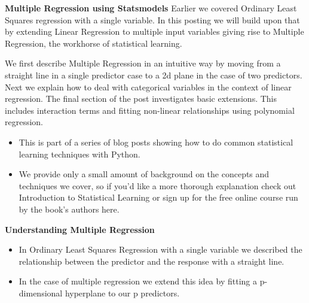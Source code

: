 \begin{frame}[fragile]
	\Large
	\textbf{Multiple Regression using Statsmodels}
Earlier we covered Ordinary Least Squares regression with a single variable. In this posting we will build upon that by extending Linear Regression to multiple input variables giving rise to Multiple Regression, the workhorse of statistical learning.
\end{frame}

\begin{frame}[fragile]
	\Large
We first describe Multiple Regression in an intuitive way by moving from a straight line in a single predictor case to a 2d plane in the case of two predictors. Next we explain how to deal with categorical variables in the context of linear regression. The final section of the post investigates basic extensions. This includes interaction terms and fitting non-linear relationships using polynomial regression.
\end{frame}

\begin{frame}[fragile]
	\Large
\begin{itemize}
	\item This is part of a series of blog posts showing how to do common statistical learning techniques with Python. 
	\item We provide only a small amount of background on the concepts and techniques we cover, so if you’d like a more thorough explanation check out Introduction to Statistical Learning or sign up for the free online course run by the book’s authors here.
\end{itemize}

\end{frame}

\begin{frame}[fragile]
	\Large
\textbf{Understanding Multiple Regression}
\begin{itemize}
\item In Ordinary Least Squares Regression with a single variable we described the relationship between the predictor and the response with a straight line. 
\item In the case of multiple regression we extend this idea by fitting a p-dimensional hyperplane to our p predictors.
\end{itemize}

\end{frame}


